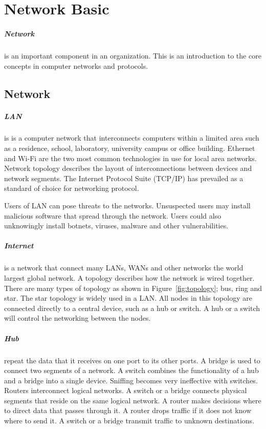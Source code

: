 \documentclass[7x9]{times}
\begin{document}
\chapternotes
 

\chapter{Network Basic}


\paragraph{Network} is an important component in an 
organization. This is an introduction to the core concepts 
in computer networks and protocols.

\section{Network}

\paragraph{LAN} is is a computer network that interconnects
computers within a limited area such as a residence, school,
laboratory, university campus or office building. Ethernet
and Wi-Fi are the two most common technologies in use for
local area networks. Network topology describes the layout
of interconnections between devices and network segments.
The Internet Protocol Suite (TCP/IP) has prevailed as a
standard of choice for networking protocol.


Users of LAN can pose threats to the networks. Unsuspected
users may install malicious software that spread through the
network. Users could also unknowingly install botnets, 
viruses, 
malware and other vulnerabilities.

\paragraph{Internet} is a network that connect many LANs,
WANs and other networks the world largest global network. A
topology describes how the network is wired together. There
are many types of topology as shown in
Figure~\ref{fig:topology}; bus, ring and star. The star
topology is widely used in a LAN. All nodes in this topology
are connected directly to a central device, such as a hub or
switch. A hub or a switch will control the networking
between the nodes.

\paragraph{Hub} repeat the data that it receives on one port
to its other ports. A bridge is used to connect two segments
of a network. A switch combines the functionality of a hub
and a bridge into a single device. Sniffing becomes very
ineffective with switches. Routers interconnect logical
networks. A switch or a bridge connects physical segments
that reside on the same logical network. A router makes
decisions where to direct data that passes through it. A
router drops traffic if it does not know where to send it. A
switch or a bridge transmit traffic to unknown destinations.
\end{document}

